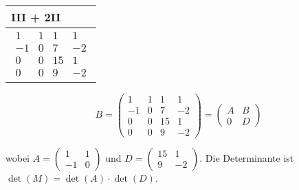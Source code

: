 \begin{longtable}{p{10cm}}
    III + 2II \\\hline\pagebreak[0]

    $\displaystyle\begin{matrix}
    1 & 1 & 1 & 1 \\
    -1 & 0 & 7 & -2 \\
    0 & 0 & 15 & 1 \\
    0 & 0 & 9 & -2 
    \end{matrix}$\\\hline


\end{longtable}

\[
B = \left( \begin{array}{cc|cc}
1 & 1 & 1 & 1 \\
-1 & 0 & 7 & -2 \\
\hline
0 & 0 & 15 & 1 \\
0 & 0 & 9 & -2
\end{array} \right)
= \begin{pmatrix} A & B \\ 0 & D \end{pmatrix}
\]

wobei $A = \begin{pmatrix} 1 & 1 \\ -1 & 0 \end{pmatrix}$ und $D = \begin{pmatrix} 15 & 1 \\ 9 & -2 \end{pmatrix}$.
Die Determinante ist $\det(M) = \det(A) \cdot \det(D)$.

\bigskip

